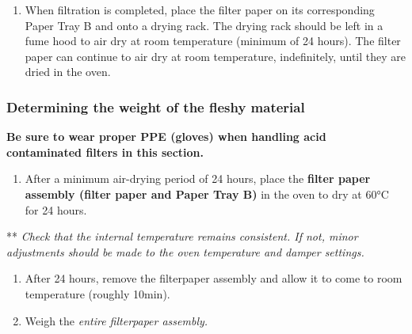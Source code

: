 \documentclass[
]{book}
\providecommand{\tightlist}{%
  \setlength{\itemsep}{0pt}\setlength{\parskip}{0pt}}
\begin{document}
\begin{enumerate}
\def\labelenumi{\arabic{enumi}.}
\setcounter{enumi}{3}
\tightlist
\item
  When filtration is completed, place the filter paper on its corresponding Paper Tray B and onto a drying rack. The drying rack should be left in a fume hood to air dry at room temperature (minimum of 24 hours). The filter paper can continue to air dry at room temperature, indefinitely, until they are dried in the oven.
\end{enumerate}

\hypertarget{determining-the-weight-of-the-fleshy-material}{%
\subsubsection{Determining the weight of the fleshy material}\label{determining-the-weight-of-the-fleshy-material}}

\textbf{Be sure to wear proper PPE (gloves) when handling acid contaminated filters in this section.}

\begin{enumerate}
\def\labelenumi{\arabic{enumi}.}
\tightlist
\item
  After a minimum air-drying period of 24 hours, place the \textbf{filter paper assembly (filter paper and Paper Tray B)} in the oven to dry at 60°C for 24 hours.
\end{enumerate}

** \emph{Check that the internal temperature remains consistent. If not, minor adjustments should be made to the oven temperature and damper settings.}

\begin{enumerate}
\def\labelenumi{\arabic{enumi}.}
\setcounter{enumi}{1}
\item
  After 24 hours, remove the filterpaper assembly and allow it to come to room temperature (roughly 10min).
\item
  Weigh the \emph{entire filterpaper assembly.}
\end{enumerate}
\end{document}
